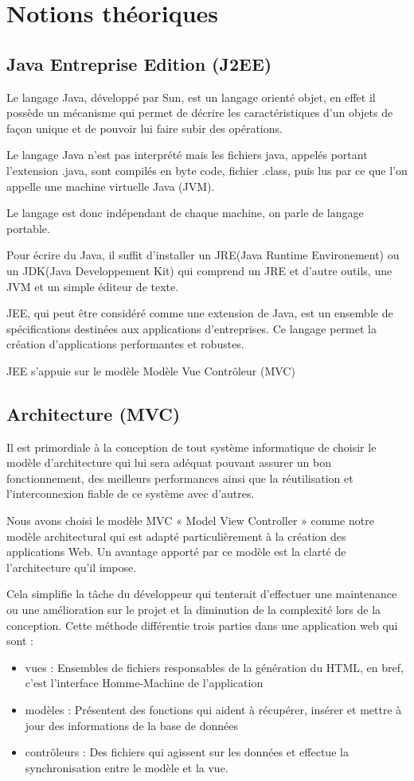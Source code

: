 \documentclass[../rapportdestage.tex]{subfiles}
\begin{document}
 


\section{Notions théoriques}
	\subsection{Java Entreprise Edition (J2EE)}
Le langage Java, développé par Sun, est un langage orienté objet, en effet il possède un
mécanisme qui permet de décrire les caractéristiques d'un objets de façon unique et de
pouvoir lui faire subir des opérations.

Le langage Java n'est pas interprété mais les fichiers java, appelés portant l'extension
.java, sont compilés en byte code, fichier .class, puis lus par ce que l'on appelle une
machine virtuelle Java (JVM).

 Le langage est donc indépendant de chaque machine, on
parle de langage portable.

Pour écrire du Java, il suffit d'installer un JRE(Java Runtime Environement) ou un
JDK(Java Developpement Kit) qui comprend un JRE et d'autre outils, une JVM et un simple éditeur de texte.

JEE, qui peut être considéré comme une extension de Java, est un ensemble de
spécifications destinées aux applications d'entreprises. Ce langage permet la création
d'applications performantes et robustes.

JEE s'appuie sur le modèle Modèle Vue Contrôleur (MVC)		
	
		
	\subsection{Architecture (MVC)}
Il est primordiale à la conception de tout système informatique de choisir le modèle d’architecture
qui lui sera adéquat pouvant assurer un bon fonctionnement, des meilleurs performances ainsi que
la réutilisation et l’interconnexion fiable de ce système avec d’autres. 

Nous avons choisi le modèle
MVC « Model View Controller » comme notre modèle architectural qui est adapté particulièrement
à la création des applications Web. Un avantage apporté par ce modèle est la clarté de l’architecture
qu’il impose.

Cela simplifie la tâche du développeur qui tenterait d’effectuer une maintenance ou une
amélioration sur le projet et la diminution de la complexité lors de la conception.
Cette méthode différentie trois parties dans une application web qui sont :
\begin{itemize}
\item vues : Ensembles de fichiers responsables de la génération du HTML, en bref, c’est l’interface Homme-Machine de l’application 
\item modèles : Présentent des fonctions qui aident à récupérer, insérer et mettre à jour des informations de la base de données
\item  contrôleurs : Des fichiers qui agissent sur les données et effectue la synchronisation entre le modèle et la vue.
\end{itemize}
\end{document}
